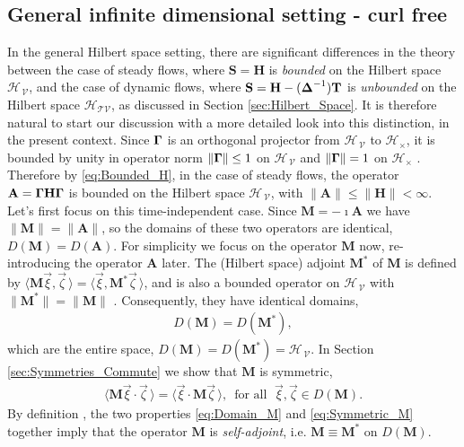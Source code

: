 \documentclass[11pt]{amsart}
\newcommand{\Mb}{\mathbf{M}}
\newcommand{\Tb}{\mathbf{T}}
\newcommand{\Hb}{\mathbf{H}}
\newcommand{\Sb}{\mathbf{S}}
\newcommand{\Ab}{\mathbf{A}}
\newcommand{\Tc}{\mathcal{T}}
\newcommand{\Vc}{\mathcal{V}}
\newcommand{\Hs}{\mathscr{H}}
\newcommand\bDelta{\mbox{\boldmath${\Delta}$}}
\newcommand\bGamma{\mbox{\boldmath${\Gamma}$}}
\begin{document}
\subsection{General infinite dimensional setting - curl free}
\label{sec:Integral_Rep_General_curl_free}
%
In the general Hilbert space setting, there are significant
differences in the theory between the case of steady flows, where
$\Sb=\Hb$ is \emph{bounded} on the Hilbert space $\Hs_{\,\Vc}$, and
the case of dynamic flows, where $\Sb=\Hb-(\bDelta^{-1})\Tb$ is
\emph{unbounded} on the Hilbert space $\Hs_{\Tc\Vc}$, as discussed in
Section \ref{sec:Hilbert_Space}. It is therefore natural to start our
discussion with a more detailed look into this distinction, in the
present context. Since $\bGamma$ is an orthogonal projector from
$\Hs_{\,\Vc}$ to $\Hs_\times$, it is bounded by unity in operator norm
$\|\bGamma\|\leq1$ on $\Hs_{\,\Vc}$ and $\|\bGamma\|=1$ on $\Hs_\times$
\cite{Reed-1980,Stone:64}. Therefore by \eqref{eq:Bounded_H}, in the
case of  steady flows, the operator $\Ab=\bGamma\Hb\bGamma$ is bounded
on the Hilbert space $\Hs_{\,\Vc}$, with $\|\Ab\|\leq\|\Hb\|<\infty$. Let's first
focus on this time-independent case. Since $\Mb=-\imath\Ab$ we have 
$\|\Mb\|=\|\Ab\|$, so the domains of these two operators are identical,
$D(\Mb)=D(\Ab)$. For simplicity we focus on the operator $\Mb$ now,
re-introducing the operator $\Ab$ later. The (Hilbert space)
adjoint $\Mb^*$ of $\Mb$ is defined by
$\langle\Mb\vec{\xi},\vec{\zeta}\,\rangle=\langle\vec{\xi},\Mb^*\vec{\zeta}\,\rangle$, and is also a
bounded operator on $\Hs_{\,\Vc}$ with $\|\Mb^*\|=\|\Mb\|$
\cite{Reed-1980}. Consequently, they have identical domains,       
%
\begin{align}\label{eq:Domain_M}
  D(\Mb)=D(\Mb^*),
\end{align}
%
which are the entire space, $D(\Mb)=D(\Mb^*)=\Hs_{\,\Vc}$. In
Section \ref{sec:Symmetries_Commute} we show that $\Mb$ is symmetric,
%
\begin{align}\label{eq:Symmetric_M}
  \langle\Mb\vec{\xi}\cdot\vec{\zeta}\,\rangle=\langle\vec{\xi}\cdot\Mb\vec{\zeta}\,\rangle,
  \, \text{ for all } \; \vec{\xi},\vec{\zeta}\in D(\Mb).
\end{align}
%
By definition \cite{Reed-1980,Stone:64}, the two properties
\eqref{eq:Domain_M} and \eqref{eq:Symmetric_M} together imply that the
operator $\Mb$ is \emph{self-adjoint}, i.e. $\Mb\equiv\Mb^*$ on $D(\Mb)$.
\end{document}
